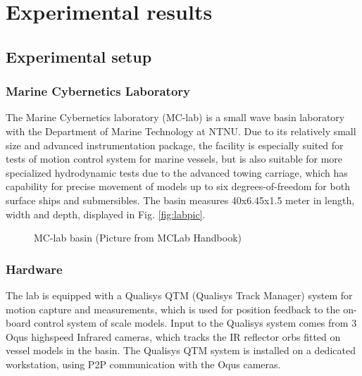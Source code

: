 
\chapter{Experimental results}

\section{Experimental setup}
\subsection{Marine Cybernetics Laboratory}
The Marine Cybernetics laboratory (MC-lab) is a small wave basin laboratory with the Department of Marine Technology at NTNU. Due to its relatively small size and advanced instrumentation package, the facility is especially suited for tests of motion control system for marine vessels, but is also suitable for more specialized hydrodynamic tests due to the advanced towing carriage, which has capability for precise movement of models up to six degrees-of-freedom for both surface ships and submersibles. The basin measures 40x6.45x1.5 meter in length, width and depth, displayed in Fig. \ref{fig:labpic}. 

\begin{figure}[!h]
    \centering
    \caption{MC-lab basin (Picture from MCLab Handbook)\cite{MClab}}
\end{figure}\label{fig:labpic}

\subsection{Hardware}

The lab is equipped with a Qualisys QTM (Qualisys Track Manager) system for motion capture and measurements, which is used for position feedback to the on-board control system of scale models. Input to the Qualisys system comes from 3 Oqus highspeed Infrared cameras, which tracks the IR reflector orbs fitted on vessel models in the basin. The Qualisys QTM system is installed on a dedicated workstation, using P2P communication with the Oqus cameras.

